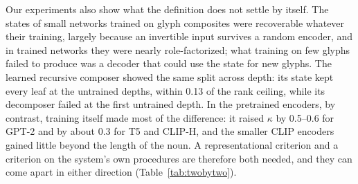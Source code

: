\documentclass[10pt]{article}
\theoremstyle{plain}
\theoremstyle{remark}
\begin{document}
Our experiments also show what the definition does not settle by itself. The states of small networks trained on glyph composites were recoverable whatever their training, largely because an invertible input survives a random encoder, and in trained networks they were nearly role-factorized; what training on few glyphs failed to produce was a decoder that could use the state for new glyphs. The learned recursive composer showed the same split across depth: its state kept every leaf at the untrained depths, within 0.13 of the rank ceiling, while its decomposer failed at the first untrained depth. In the pretrained encoders, by contrast, training itself made most of the difference: it raised $\kappa$ by 0.5--0.6 for GPT-2 and by about 0.3 for T5 and CLIP-H, and the smaller CLIP encoders gained little beyond the length of the noun. A representational criterion and a criterion on the system's own procedures are therefore both needed, and they can come apart in either direction (Table~\ref{tab:twobytwo}).
\end{document}
